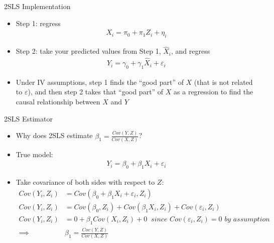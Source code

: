 \documentclass[aspectratio=169,11pt]{beamer}
\begin{document}
\begin{frame}{2SLS Implementation}
\begin{itemize}
\item Step 1: regress
\begin{align*}
X_i=\pi_0 + \pi_1 Z_i + \eta_i
\end{align*}
\item Step 2: take your predicted values from Step 1, $\hat{X}_i$, and regress
\begin{align*}
Y_i=\gamma_0 + \gamma_1 \hat{X}_i + \varepsilon_i
\end{align*}
\item Under IV assumptions, step 1 finds the ``good part'' of $X$ (that is not related to $\varepsilon$), and then step 2 takes that ``good part'' of $X$ as a regression to find the causal relationship between $X$ and $Y$
\end{itemize}
\end{frame}


\begin{frame}{2SLS Estimator}
\begin{itemize}
\item Why does 2SLS estimate $\beta_1=\frac{Cov(Y,Z)}{Cov(X,Z)}$?
\medskip
\item True model:
\begin{align*}
Y_i=\beta_0 + \beta_1 X_i + \varepsilon_i
\end{align*}
\item Take covariance of both sides with respect to $Z$:
\begin{align*}
Cov(Y_i, Z_i)&=Cov(\beta_0 + \beta_1 X_i + \varepsilon_i, Z_i) \\
Cov(Y_i, Z_i)& = Cov(\beta_0, Z_i) + Cov(\beta_1 X_i, Z_i) + Cov(\varepsilon_i, Z_i)\\
Cov(Y_i, Z_i)& = 0 + \beta_1Cov( X_i, Z_i) +0 \;\; \textit{since $Cov(\varepsilon_i, Z_i)=0$ by assumption} \\
\implies & \beta_1 =\frac{Cov(Y,Z)}{Cov(X,Z)}
\end{align*}
\end{itemize}
\end{frame}
\end{document}
